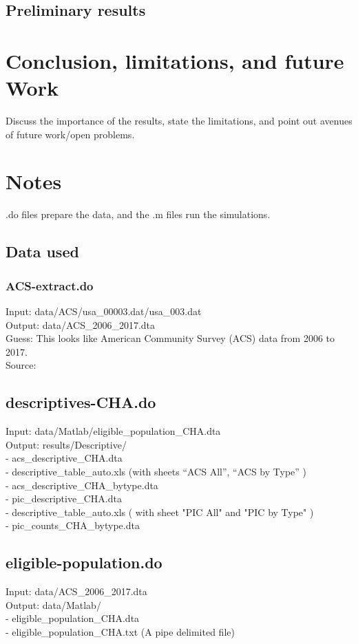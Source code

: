 \documentclass[11pt]{article}
\begin{document}
\subsection{Preliminary results}


\section{Conclusion, limitations, and future Work}
Discuss the importance of the results, state the limitations, and point out avenues of future work/open problems.
\newpage
\section{Notes}
.do files prepare the data, and the .m files run the simulations.
\subsection{Data used}
\subsubsection{ACS-extract.do}
Input: data/ACS/usa\_00003.dat/usa\_003.dat \\
Output: data/ACS\_2006\_2017.dta \\
Guess: This looks like American Community Survey (ACS) data from 2006 to 2017. \\
Source: 

\subsection{descriptives-CHA.do}
Input: data/Matlab/eligible\_population\_CHA.dta \\
Output:  results/Descriptive/ \\
- acs\_descriptive\_CHA.dta \\
- descriptive\_table\_auto.xls  (with sheets “ACS All”, “ACS by Type” )\\
		- acs\_descriptive\_CHA\_bytype.dta\\
		- pic\_descriptive\_CHA.dta\\
		- descriptive\_table\_auto.xls ( with sheet "PIC All" and "PIC by Type" )\\
		- pic\_counts\_CHA\_bytype.dta\\

\subsection{eligible-population.do}
Input: data/ACS\_2006\_2017.dta\\
Output: data/Matlab/ \\
- eligible\_population\_CHA.dta\\
- eligible\_population\_CHA.txt (A pipe delimited file)
\end{document}
